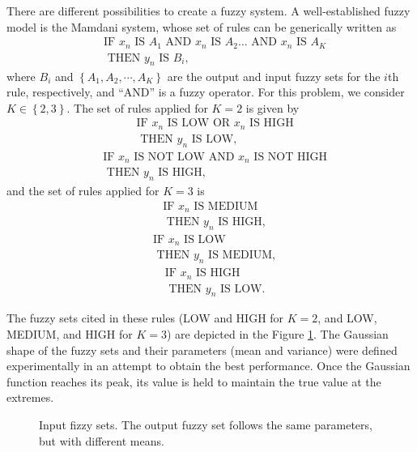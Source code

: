 \documentclass[english]{sobraep}
\begin{document}
There are different possibilities to create a fuzzy system. A well-established fuzzy model is the Mamdani system, whose set of rules can be generically written as
\begin{align}
    &\text{IF } x_n \text{ IS } A_1 \text{ AND } x_n \text{ IS } A_2 ... \text{ AND } x_n \text{ IS } A_K \nonumber \\
    &\text{ THEN } y_n \text{ IS } B_i, \nonumber
\end{align}
where \(B_i\) and \(\left\{ A_1, A_2, \cdots, A_K \right\}\) are the output and input fuzzy sets for the \(i\)th rule, respectively, and ``AND'' is a fuzzy operator. For this problem, we consider \(K \in \left\{ 2,3 \right\}\). The set of rules applied for \(K=2\) is given by
\begin{align}
    &\text{IF } x_n \text{ IS LOW OR } x_n \text{ IS HIGH} \nonumber \\
    &\text{ THEN } y_n \text{ IS LOW}, \nonumber
\end{align}
\begin{align}
    &\text{IF } x_n \text{ IS NOT LOW AND } x_n \text{ IS NOT HIGH} \nonumber \\
    &\text{ THEN } y_n \text{ IS HIGH}, \nonumber
\end{align}
and the set of rules applied for \(K=3\) is
\begin{align}
    &\text{IF } x_n \text{ IS MEDIUM} \nonumber \\
    &\text{ THEN } y_n \text{ IS HIGH}, \nonumber
\end{align}
\begin{align}
    &\text{IF } x_n \text{ IS LOW} \nonumber \\
    &\text{ THEN } y_n \text{ IS MEDIUM}, \nonumber
\end{align}
\begin{align}
    &\text{IF } x_n \text{ IS HIGH} \nonumber \\
    &\text{ THEN } y_n \text{ IS LOW}. \nonumber
\end{align}

The fuzzy sets cited in these rules (LOW and HIGH for \(K=2\), and LOW, MEDIUM, and HIGH for \(K=3\)) are depicted in the Figure \ref{fig:input-fuzzy-sets}. The Gaussian shape of the fuzzy sets and their parameters (mean and variance) were defined experimentally in an attempt to obtain the best performance. Once the Gaussian function reaches its peak, its value is held to maintain the true value at the extremes.
\begin{figure}[htp]
    
    
    \caption{Input fizzy sets. The output fuzzy set follows the same parameters, but with different means.}
    \label{fig:input-fuzzy-sets}
\end{figure}
\end{document}

